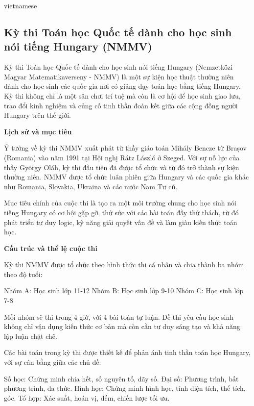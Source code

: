 \documentclass{article}
\begin{document}
\begin{otherlanguage*}{vietnamese}
\newpage

\subsection{Kỳ thi Toán học Quốc tế dành cho học sinh nói tiếng Hungary (NMMV)}

Kỳ thi Toán học Quốc tế dành cho học sinh nói tiếng Hungary (Nemzetközi Magyar Matematikaverseny - NMMV) là một sự kiện học thuật thường niên dành cho học sinh các quốc gia nơi có giảng dạy toán học bằng tiếng Hungary. Kỳ thi không chỉ là một sân chơi trí tuệ mà còn là cơ hội để học sinh giao lưu, trao đổi kinh nghiệm và củng cố tinh thần đoàn kết giữa các cộng đồng người Hungary trên thế giới.

\textbf{Lịch sử và mục tiêu}

Ý tưởng về kỳ thi NMMV xuất phát từ thầy giáo toán Mihály Bencze từ Brașov (Romania) vào năm 1991 tại Hội nghị Rátz László ở Szeged. Với sự nỗ lực của thầy György Oláh, kỳ thi đầu tiên đã được tổ chức và từ đó trở thành sự kiện thường niên. NMMV được tổ chức luân phiên giữa Hungary và các quốc gia khác như Romania, Slovakia, Ukraina và các nước Nam Tư cũ.

Mục tiêu chính của cuộc thi là tạo ra một môi trường chung cho học sinh nói tiếng Hungary có cơ hội gặp gỡ, thử sức với các bài toán đầy thử thách, từ đó phát triển tư duy logic, kỹ năng giải quyết vấn đề và làm giàu kiến thức toán học.

\textbf{Cấu trúc và thể lệ cuộc thi}

Kỳ thi NMMV được tổ chức theo hình thức thi cá nhân và chia thành ba nhóm theo độ tuổi:
\begin{enumerate}[topsep=0pt, partopsep=0pt, itemsep=0pt]
    \ii Nhóm A: Học sinh lớp 11-12
    \ii Nhóm B: Học sinh lớp 9-10
    \ii Nhóm C: Học sinh lớp 7-8
\end{enumerate}

Mỗi nhóm sẽ thi trong 4 giờ, với 4 bài toán tự luận. Đề thi yêu cầu học sinh không chỉ vận dụng kiến thức cơ bản mà còn cần tư duy sáng tạo và khả năng lập luận chặt chẽ.

Các bài toán trong kỳ thi được thiết kế để phản ánh tinh thần toán học Hungary, với sự cân bằng giữa các chủ đề:
\begin{itemize}[topsep=0pt, partopsep=0pt, itemsep=0pt]
    \ii Số học: Chứng minh chia hết, số nguyên tố, dãy số.
    \ii Đại số: Phương trình, bất phương trình, đa thức.
    \ii Hình học: Chứng minh hình học, tính diện tích, thể tích, góc.
    \ii Tổ hợp: Xác suất, hoán vị, đếm, chiến lược tối ưu.
\end{itemize}


\end{otherlanguage*}
\end{document}
